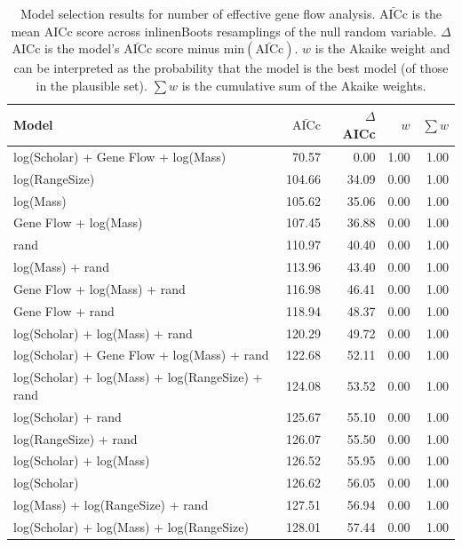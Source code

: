 \begin{table}[ht]
\centering
\caption{
  Model selection results for number of effective gene flow analysis. 
  $\bar{\text{AICc}}$ is the mean AICc score across 
inline{nBoots} resamplings of the null random variable. 
  $\Delta$AICc is the model's $\bar{\text{AICc}}$ score minus $\text{min}(\bar{\text{AICc}})$. 
  $w$ is the Akaike weight and can be interpreted as the probability that the model is the best model (of those in the plausible set).
  $\sum w$ is the cumulative sum of the Akaike weights.
  } 
\label{A-fstModelWeights}
\begingroup\scriptsize
\begin{tabular}{@{}lrrrr@{}}
  \toprule
Model & $\bar{\text{AICc}}$ & $\Delta$AICc & $w$ & $\sum w$ \\ 
  \midrule
log(Scholar) + Gene Flow + log(Mass) & 70.57 & 0.00 & 1.00 & 1.00 \\ 
  log(RangeSize) & 104.66 & 34.09 & 0.00 & 1.00 \\ 
  log(Mass) & 105.62 & 35.06 & 0.00 & 1.00 \\ 
  Gene Flow + log(Mass) & 107.45 & 36.88 & 0.00 & 1.00 \\ 
  rand & 110.97 & 40.40 & 0.00 & 1.00 \\ 
  log(Mass) + rand & 113.96 & 43.40 & 0.00 & 1.00 \\ 
  Gene Flow + log(Mass) + rand & 116.98 & 46.41 & 0.00 & 1.00 \\ 
  Gene Flow + rand & 118.94 & 48.37 & 0.00 & 1.00 \\ 
  log(Scholar) + log(Mass) + rand & 120.29 & 49.72 & 0.00 & 1.00 \\ 
  log(Scholar) + Gene Flow + log(Mass) + rand & 122.68 & 52.11 & 0.00 & 1.00 \\ 
  log(Scholar) + log(Mass) + log(RangeSize) + rand & 124.08 & 53.52 & 0.00 & 1.00 \\ 
  log(Scholar) + rand & 125.67 & 55.10 & 0.00 & 1.00 \\ 
  log(RangeSize) + rand & 126.07 & 55.50 & 0.00 & 1.00 \\ 
  log(Scholar) + log(Mass) & 126.52 & 55.95 & 0.00 & 1.00 \\ 
  log(Scholar) & 126.62 & 56.05 & 0.00 & 1.00 \\ 
  log(Mass) + log(RangeSize) + rand & 127.51 & 56.94 & 0.00 & 1.00 \\ 
  log(Scholar) + log(Mass) + log(RangeSize) & 128.01 & 57.44 & 0.00 & 1.00 \\ 

\end{tabular}
\end{table}
